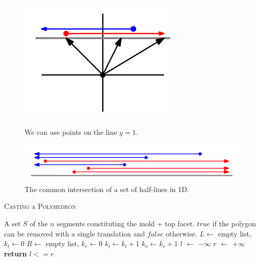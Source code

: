 \documentclass[11pt]{article}
\begin{document}
\begin{enumerate}
\begin{figure}[ht]
  \begin{minipage}[b]{0.5\linewidth}
    \centering
    \includegraphics[width=.7\linewidth]{castingpolyhedron3}
    \caption{We can use points on the line $y=1$.} 
    \vspace{4ex}
  \end{minipage}%
  \begin{minipage}[b]{0.5\linewidth}
    \centering
    \includegraphics[width=.7\linewidth]{castingpolyhedron4}
    \caption{The common intersection of a set of half-lines in 1D.} 
    \vspace{4ex}
  \end{minipage} 
\end{figure}

    \begin{algorithm}[ht!]
    \caption{\textsc{Casting a Polyhedron}}
    \label{algo4}
    \begin{algorithmic}[1]

    \Require A set $S$ of the $n$ segments constituting the mold + top facet.
    \Ensure $true$ if the polygon can be removed with a single translation and $false$ otherwise.
    \State $L \gets$ empty list, $k_l \gets 0$
    \State $R \gets$ empty list, $k_r \gets 0$
     
            \State $k_l \gets k_l+1$
        \EndIf
            \State $k_r \gets k_r+1$
        \EndIf
    \EndFor
    \State $l$ $\gets$ $-\infty$
    \State $r$ $\gets$ $+\infty$
     
            \EndIf
    \EndFor
     
            \EndIf
    \EndFor
      \State \textbf{return} $l<=r$
    \end{algorithmic}
    \end{algorithm}
    


\end{enumerate}
\end{document}
